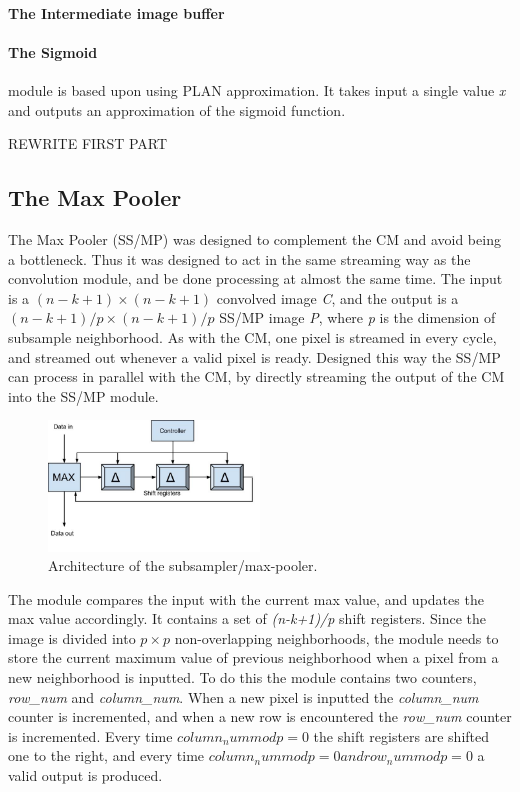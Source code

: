 \paragraph{The Intermediate image buffer}

\paragraph{The Sigmoid} module is based upon \cite{Napocensis2009} using PLAN approximation. It takes input a single value \textit{x} and outputs an approximation of the sigmoid function.

\vspace*{1\baselineskip}
REWRITE FIRST PART
\subsection{The Max Pooler} 

The Max Pooler (SS/MP) was designed to complement the CM and avoid being a bottleneck. Thus it was designed to act in the same streaming way as the convolution module, and be done processing at almost the same time. The input is a $ (n-k+1) \times (n-k+1) $ convolved image \textit{C}, and the output is a $ (n-k+1)/p \times (n-k+1)/p $ SS/MP image \textit{P}, where \textit{p} is the dimension of subsample neighborhood. As with the CM, one pixel is streamed in every cycle, and streamed out whenever a valid pixel is ready. Designed this way the SS/MP can process in parallel with the CM, by directly streaming the output of the CM into the SS/MP module. 

\begin{figure}[h!]
  \centering
      \includegraphics[width=0.5\textwidth]{Figures/Method/submax}
  \caption{Architecture of the subsampler/max-pooler.}
\end{figure}

The module compares the input with the current max value, and updates the max value accordingly. It contains a set of \textit{(n-k+1)/p} shift registers. Since the image is divided into $ p \times p $ non-overlapping neighborhoods, the module needs to store the current maximum value of previous neighborhood when a pixel from a new neighborhood is inputted. To do this the module contains two counters, \textit{row\_num} and \textit{column\_num}. When a new pixel is inputted the \textit{column\_num} counter is incremented, and when a new row is encountered the \textit{row\_num} counter is incremented. Every time $ column_num mod p = 0 $ the shift registers are shifted one to the right, and every time $ column_num mod p = 0 and row_num mod p = 0 $ a valid output is produced. 

